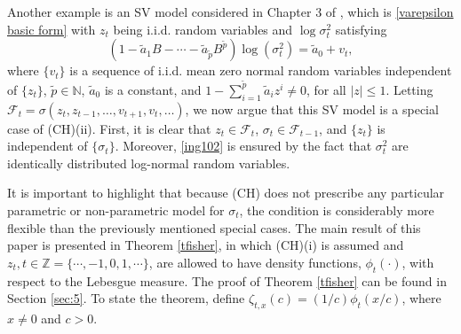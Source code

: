 \documentclass[ejsv2]{imsart}
\theoremstyle{plain}
\theoremstyle{definition}
\theoremstyle{remark}
\begin{document}
Another example is an SV model considered in Chapter 3 of \cite{Tsay2010}, 
which is \eqref{varepsilon basic form} with $z_t$ being i.i.d. random variables and
$\log \sigma_t^2$ satisfying
\begin{equation}\label{SV model}
      (1-\tilde{a}_1B-\cdots-\tilde{a}_{\tilde{p}}B^{\tilde{p}})\log(\sigma_t^2)=\tilde{a}_0+v_t,
\end{equation}
where $\{v_t\}$ is a sequence of i.i.d. mean zero normal random variables independent of $\{z_t\}$,
$\tilde{p}\in\mathbb{N}$, $\tilde{a}_0$ is a
constant, and $1-\sum_{i=1}^{\tilde{p}}\tilde{a}_iz^i\neq0$, for all $|z|\leq1$. 
Letting $\mathcal{F}_{t}=\sigma(z_t,z_{t-1},\ldots,v_{t+1},v_t,\ldots)$,
we now argue that this SV model is a special case of (CH)(ii).
First, it is clear that $z_t\in\mathcal{F}_{t}$, $\sigma_t\in\mathcal{F}_{t-1}$,
and $\{z_t\}$ is independent of $\{\sigma_t\}$. Moreover, %
\eqref{ing102} is ensured by the fact that
$\sigma_t^2$ are identically distributed log-normal random variables.

It is important to highlight that because 
(CH) does not prescribe any particular parametric or non-parametric model for $\sigma_t$, the condition is considerably more flexible than the previously mentioned special cases. 
The main result of this paper is presented in Theorem \ref{tfisher}, in which
(CH)(i) is assumed and
$z_t, t \in \mathbb{Z}=\{\cdots, -1,0,1,\cdots\}$, are allowed to have density functions,
$\phi_t(\cdot)$, with respect to the Lebesgue measure.
The proof of Theorem \ref{tfisher} can be found in Section \ref{sec:5}. %
To state the theorem, 
define $\zeta_{t,x}(c)=(1/c)\phi_t(x/c)$, where 
$x \neq 0$ and
$c>0$.
\end{document}
